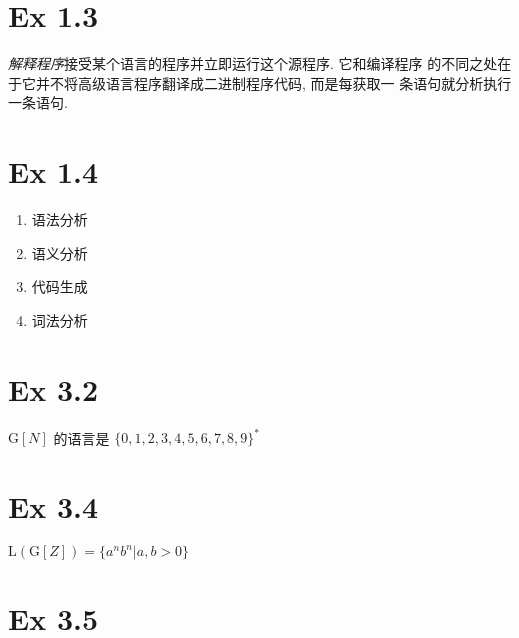 \newcommand{\vor}{\ |\ }

\newcommand{\doctitle}{编译原理第一次作业}


\section{Ex 1.3}

\begin{solve}
  \emph{解释程序}接受某个语言的程序并立即运行这个源程序. 它和编译程序
  的不同之处在于它并不将高级语言程序翻译成二进制程序代码, 而是每获取一
  条语句就分析执行一条语句.
\end{solve}

\section{Ex 1.4}

\begin{solve}
  \begin{enumerate}
  \item 语法分析
  \item 语义分析
  \item 代码生成
  \item 词法分析
  \end{enumerate}
\end{solve}

\section{Ex 3.2}

\begin{solve}
  $\mathrm{G}[N]$ 的语言是 $\{0, 1, 2, 3, 4, 5, 6, 7, 8, 9\}^*$
\end{solve}

\section{Ex 3.4}

\begin{solve}
  $\mathrm{L}(\mathrm{G}[Z]) = \{a^nb^n | a,b>0\}$
\end{solve}

\section{Ex 3.5}

